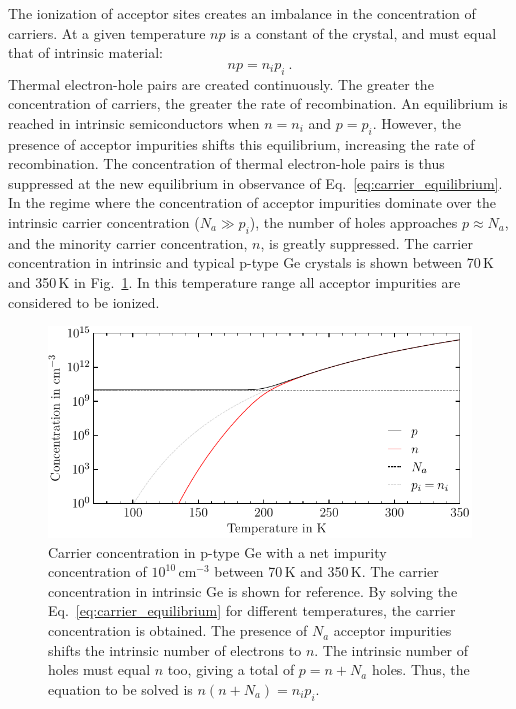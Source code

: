 The ionization of acceptor sites creates an imbalance in the concentration of carriers. At a given temperature $np$ is a constant of the crystal, and must equal that of intrinsic material:
\begin{equation}
	np = n_ip_i~.
	\label{eq:carrier_equilibrium}
\end{equation}
Thermal electron-hole pairs are created continuously. The greater the concentration of carriers, the greater the rate of recombination. An equilibrium is reached in intrinsic semiconductors when $n=n_i$ and $p = p_i$. However, the presence of acceptor impurities shifts this equilibrium, increasing the rate of recombination. The concentration of thermal electron-hole pairs is thus suppressed at the new equilibrium in observance of Eq.~\ref{eq:carrier_equilibrium}. In the regime where the concentration of acceptor impurities dominate over the intrinsic carrier concentration ($N_a \gg p_i$), the number of holes approaches $p \approx N_a$, and the minority carrier concentration, $n$, is greatly suppressed. The carrier concentration in intrinsic and typical p-type Ge crystals is shown between 70\,K and 350\,K in Fig.~\ref{fig:carriers}. In this temperature range all acceptor impurities are considered to be ionized.
\begin{figure}[htb]
	\centering
	\includegraphics[width=5in]{figs/ge/carriers_width_5in.pdf}
	\caption{Carrier concentration in p-type Ge with a net impurity concentration of $10^{10}$\,cm$^{-3}$ between 70\,K and 350\,K. The carrier concentration in intrinsic Ge is shown for reference. By solving the Eq.~\ref{eq:carrier_equilibrium} for different temperatures, the carrier concentration is obtained. The presence of $N_a$ acceptor impurities shifts the intrinsic number of electrons to $n$. The intrinsic number of holes must equal $n$ too, giving a total of $p = n+N_a$ holes. Thus, the equation to be solved is $n(n+N_a) = n_ip_i$.} 
	\label{fig:carriers}
\end{figure}

